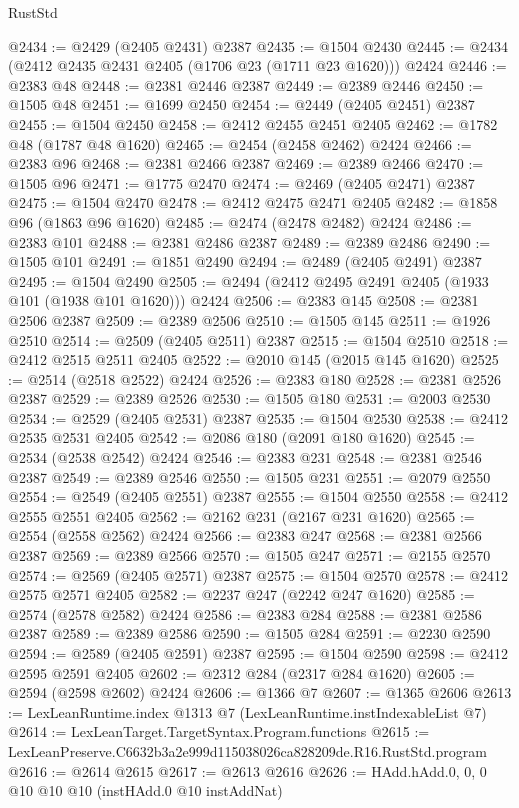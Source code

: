 \begin{lexlean}{RustStd}
\begin{coremodule}
@2434 := @2429 (@2405 @2431) @2387
@2435 := @1504 @2430
@2445 := @2434 (@2412 @2435 @2431 @2405 (@1706 @23 (@1711 @23 @1620))) @2424
@2446 := @2383 @48
@2448 := @2381 @2446 @2387
@2449 := @2389 @2446
@2450 := @1505 @48
@2451 := @1699 @2450
@2454 := @2449 (@2405 @2451) @2387
@2455 := @1504 @2450
@2458 := @2412 @2455 @2451 @2405
@2462 := @1782 @48 (@1787 @48 @1620)
@2465 := @2454 (@2458 @2462) @2424
@2466 := @2383 @96
@2468 := @2381 @2466 @2387
@2469 := @2389 @2466
@2470 := @1505 @96
@2471 := @1775 @2470
@2474 := @2469 (@2405 @2471) @2387
@2475 := @1504 @2470
@2478 := @2412 @2475 @2471 @2405
@2482 := @1858 @96 (@1863 @96 @1620)
@2485 := @2474 (@2478 @2482) @2424
@2486 := @2383 @101
@2488 := @2381 @2486 @2387
@2489 := @2389 @2486
@2490 := @1505 @101
@2491 := @1851 @2490
@2494 := @2489 (@2405 @2491) @2387
@2495 := @1504 @2490
@2505 := @2494 (@2412 @2495 @2491 @2405 (@1933 @101 (@1938 @101 @1620))) @2424
@2506 := @2383 @145
@2508 := @2381 @2506 @2387
@2509 := @2389 @2506
@2510 := @1505 @145
@2511 := @1926 @2510
@2514 := @2509 (@2405 @2511) @2387
@2515 := @1504 @2510
@2518 := @2412 @2515 @2511 @2405
@2522 := @2010 @145 (@2015 @145 @1620)
@2525 := @2514 (@2518 @2522) @2424
@2526 := @2383 @180
@2528 := @2381 @2526 @2387
@2529 := @2389 @2526
@2530 := @1505 @180
@2531 := @2003 @2530
@2534 := @2529 (@2405 @2531) @2387
@2535 := @1504 @2530
@2538 := @2412 @2535 @2531 @2405
@2542 := @2086 @180 (@2091 @180 @1620)
@2545 := @2534 (@2538 @2542) @2424
@2546 := @2383 @231
@2548 := @2381 @2546 @2387
@2549 := @2389 @2546
@2550 := @1505 @231
@2551 := @2079 @2550
@2554 := @2549 (@2405 @2551) @2387
@2555 := @1504 @2550
@2558 := @2412 @2555 @2551 @2405
@2562 := @2162 @231 (@2167 @231 @1620)
@2565 := @2554 (@2558 @2562) @2424
@2566 := @2383 @247
@2568 := @2381 @2566 @2387
@2569 := @2389 @2566
@2570 := @1505 @247
@2571 := @2155 @2570
@2574 := @2569 (@2405 @2571) @2387
@2575 := @1504 @2570
@2578 := @2412 @2575 @2571 @2405
@2582 := @2237 @247 (@2242 @247 @1620)
@2585 := @2574 (@2578 @2582) @2424
@2586 := @2383 @284
@2588 := @2381 @2586 @2387
@2589 := @2389 @2586
@2590 := @1505 @284
@2591 := @2230 @2590
@2594 := @2589 (@2405 @2591) @2387
@2595 := @1504 @2590
@2598 := @2412 @2595 @2591 @2405
@2602 := @2312 @284 (@2317 @284 @1620)
@2605 := @2594 (@2598 @2602) @2424
@2606 := @1366 @7
@2607 := @1365 @2606
@2613 := LexLeanRuntime.index @1313 @7 (LexLeanRuntime.instIndexableList @7)
@2614 := LexLeanTarget.TargetSyntax.Program.functions
@2615 := LexLeanPreserve.C6632b3a2e999d115038026ca828209de.R16.RustStd.program
@2616 := @2614 @2615
@2617 := @2613 @2616
@2626 := HAdd.hAdd.{0, 0, 0} @10 @10 @10 (instHAdd.{0} @10 instAddNat)

\end{coremodule}
\end{lexlean}
